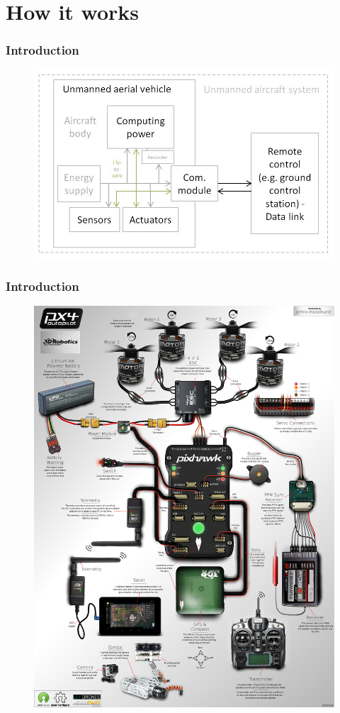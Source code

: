 \section{How it works}

\begin{frame}

\frametitle{Introduction}
\begin{figure}[H]
  \begin{center}
  \includegraphics[scale=0.45]{fig/uav_hardware.jpg}
  \end{center}
\end{figure}

\end{frame}



\begin{frame}

\frametitle{Introduction}
\begin{figure}[H]
  \begin{center}
  \includegraphics[scale=0.12]{fig/all_devices.jpg}
  \end{center}
\end{figure}

\end{frame}
